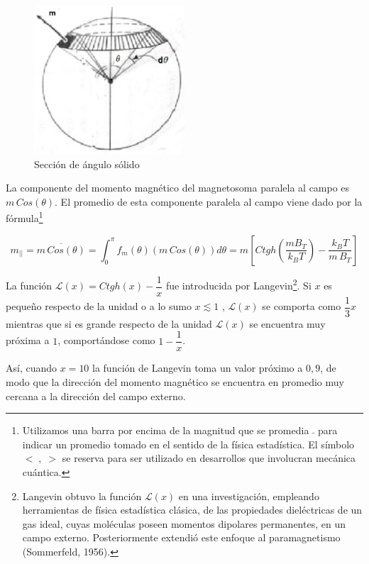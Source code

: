 \begin{figure}[H]
    \centering
    \includegraphics[width=0.5\textwidth]{./Figures/fig64}
	\caption{Sección de ángulo sólido}
	\label{fig:64}
\end{figure}

La componente del momento magnético del magnetosoma paralela al campo es $m\, Cos(\theta)$. El promedio de esta componente paralela al campo viene dado por la fórmula\footnote{Utilizamos una barra por encima de la magnitud que se promedia $\bar{ }$ para indicar un promedio tomado en el sentido de la física estadística. El símbolo $<\;,\;>$ se reserva para ser utilizado en desarrollos que involucran mecánica cuántica.}

\begin{equation}
	\label{eq:61}
	m_{\vert\vert}=\overline{m\, Cos(\theta)}=\int_{0}^{\pi}f_{m}(\theta)(m\,Cos(\theta))d\theta=m\left[ Ctgh\left( \dfrac{m B_{T}}{k_{B}T}\right) -\dfrac{k_{B}T}{m\,B_{T}} \right] 
\end{equation}


La función $\mathcal{L}(x)=Ctgh(x)-\dfrac{1}{x}$ fue introducida por Langevin\footnote{Langevin obtuvo la función $\mathcal{L}(x)$ en una investigación, empleando herramientas de física estadística clásica, de las propiedades dieléctricas de un gas ideal, cuyas moléculas poseen momentos dipolares permanentes, en un campo externo. Posteriormente extendió este enfoque al paramagnetismo (Sommerfeld, 1956).}. Si $x$ es pequeño respecto de la unidad o a lo sumo $x\lesssim 1$ , $\mathcal{L}(x)$ se comporta como $\dfrac{1}{3}x$ mientras que si es grande respecto de la unidad $\mathcal{L}(x)$  se encuentra muy próxima a $1$, comportándose como $1-\dfrac{1}{x}$.

Así, cuando $x=10$ la función de Langevin toma un valor próximo a $0,9$, de modo que la dirección del momento magnético se encuentra en promedio muy cercana a la dirección del campo externo.

